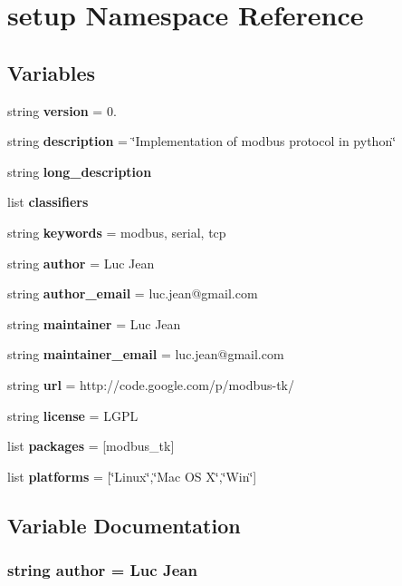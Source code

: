 \section{setup Namespace Reference}
\label{namespacesetup}
\subsection*{Variables}
\begin{DoxyCompactItemize}
\item 
string {\bf version} = \textquotesingle{}0.\textquotesingle{}
\item 
string {\bf description} = \char`\"{}Implementation of modbus protocol in python\char`\"{}
\item 
string {\bf long\+\_\+description}
\item 
list {\bf classifiers}
\item 
string {\bf keywords} = \textquotesingle{}modbus, serial, tcp\textquotesingle{}
\item 
string {\bf author} = \textquotesingle{}Luc Jean\textquotesingle{}
\item 
string {\bf author\+\_\+email} = \textquotesingle{}luc.\+jean@gmail.\+com\textquotesingle{}
\item 
string {\bf maintainer} = \textquotesingle{}Luc Jean\textquotesingle{}
\item 
string {\bf maintainer\+\_\+email} = \textquotesingle{}luc.\+jean@gmail.\+com\textquotesingle{}
\item 
string {\bf url} = \textquotesingle{}http\+://code.\+google.\+com/p/modbus-\/tk/\textquotesingle{}
\item 
string {\bf license} = \textquotesingle{}L\+G\+P\+L\textquotesingle{}
\item 
list {\bf packages} = [\textquotesingle{}modbus\+\_\+tk\textquotesingle{}]
\item 
list {\bf platforms} = [\char`\"{}Linux\char`\"{},\char`\"{}Mac O\+S X\char`\"{},\char`\"{}Win\char`\"{}]
\end{DoxyCompactItemize}


\subsection{Variable Documentation}
\subsubsection[{author}]{\setlength{\rightskip}{0pt plus 5cm}string author = \textquotesingle{}Luc Jean\textquotesingle{}}\label{namespacesetup_ab873cebb3b7e47db4fe59837d1aaa210}


